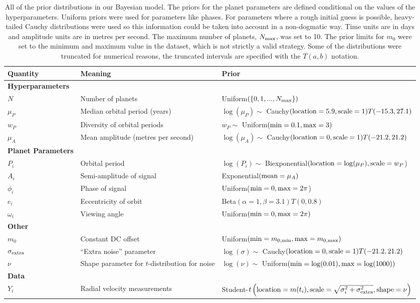 \documentclass[useAMS,usenatbib]{mn2e}
\begin{document}
\begin{table}
\begin{tabular}{|l|l|l|}
\hline
Quantity	&	Meaning		& Prior\\
\hline
{\bf Hyperparameters}	&	\\
$N$		& Number of planets	& Uniform$(\{0, 1, ..., N_{\rm max}\})$\\
$\mu_P$		&	Median orbital period (years)	& $\log(\mu_P) \sim$ Cauchy$({\rm location}=5.9, {\rm scale}=1)T(-15.3, 27.1)$\\
$w_P$		&	Diversity of orbital periods & $w_P \sim$ Uniform$({\rm min}=0.1, {\rm max}=3)$\\
$\mu_A$		&	Mean amplitude (metres per second)	& $\log(\mu_A) \sim$ Cauchy$({\rm location}=0, {\rm scale}=1)T(-21.2, 21.2)$\\
\hline
{\bf Planet Parameters}\\
$P_i$		&	Orbital period	&	$\log(P_i) \sim $ Biexponential$({\rm location}=\log(\mu_P), {\rm scale}=w_P$)\\
$A_i$		&	Semi-amplitude of signal	& Exponential$(\textnormal{mean}=\mu_A)$\\
$\phi_i$	&	Phase of signal	&	Uniform($\textnormal{min}=0, \textnormal{max}=2\pi$)\\
$e_i$		&	Eccentricity of orbit	&	Beta$(\alpha=1, \beta=3.1)T(0, 0.8)$\\
$\omega_i$	&	Viewing angle	&	Uniform$({\rm min}=0, {\rm max}=2\pi)$\\
\hline
{\bf Other}\\
$m_0$		&	Constant DC offset	&	Uniform$({\rm min}=m_{0, \rm min}, {\rm max}=m_{0, \rm max})$\\
$\sigma_{\rm extra}$	& ``Extra noise'' parameter	& $\log(\sigma) \sim$ Cauchy$({\rm location}=0, {\rm scale}=1)T(-21.2, 21.2)$\\
$\nu$		& Shape parameter for $t$-distribution for noise & $\log(\nu) \sim$ Uniform$({\rm min}=\log(0.01), {\rm max}=\log(1000))$\\
\hline
{\bf Data}\\
$Y_i$		& Radial velocity measurements	&
		Student-$t\left({\rm location}=m(t_i), {\rm scale}=\sqrt{\sigma_i^2 + \sigma_{\rm extra}^2}, {\rm shape}=\nu\right)$
\end{tabular}
\caption{All of the prior distributions in our Bayesian model.
The priors for the planet parameters are defined conditional on the values
of the hyperparameters. Uniform priors were used for parameters like phases.
For parameters where a rough initial guess is possible, heavy-tailed Cauchy
distributions were used so this information could be taken into account
in a non-dogmatic way. Time units are in days and amplitude units are
in metres per second. The maximum number of planets, $N_{\rm max}$, was set
to 10. The prior limits for $m_0$ were set to the minimum and maximum value
in the dataset, which is not strictly a valid strategy. Some of the distributions
were truncated for numerical reasons, the truncated intervals are specified with the
$T(a,b)$ notation.\label{tab:priors}}
\end{table}
\end{document}
